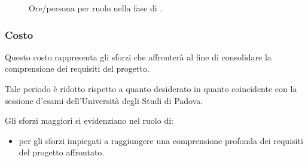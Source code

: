 \begin{figure}[H]
\caption{Ore/persona per ruolo nella fase di \ARI.}
\label{fig:ari2}

\end{figure}

\pagebreak

\subsubsection{Costo \ARI}

\introcosto{\ARI}
Questo costo rappresenta gli sforzi che {\hx} affronterà al fine di consolidare la comprensione dei requisiti del progetto.

Tale periodo è ridotto rispetto a quanto desiderato in quanto coincidente con la sessione d'esami dell'Università degli Studi di Padova. %

Gli sforzi maggiori si evidenziano nel ruolo di:
\begin{itemize}
\item {\ANx} per gli sforzi impiegati a raggiungere una comprensione profonda dei requisiti del progetto affrontato.
\end{itemize}


